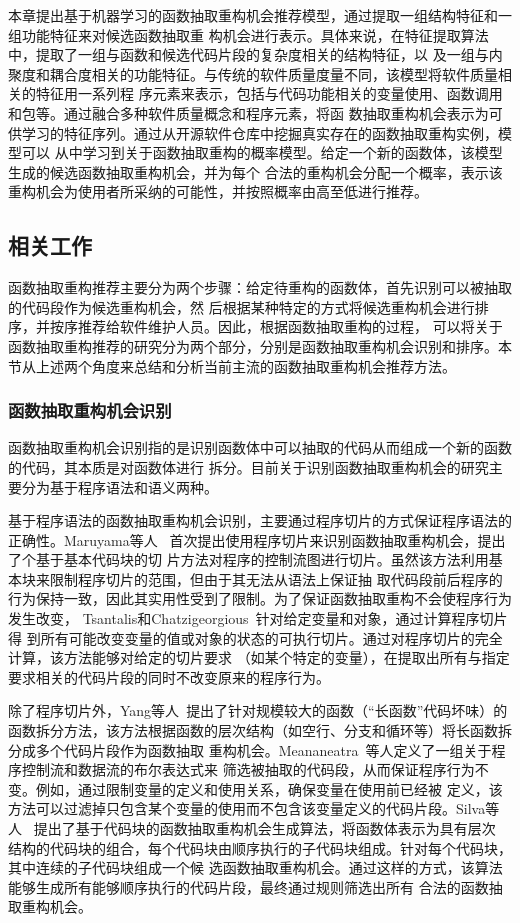 本章提出基于机器学习的函数抽取重构机会推荐模型，通过提取一组结构特征和一组功能特征来对候选函数抽取重
构机会进行表示。具体来说，在特征提取算法中，提取了一组与函数和候选代码片段的复杂度相关的结构特征，以
及一组与内聚度和耦合度相关的功能特征。与传统的软件质量度量不同，该模型将软件质量相关的特征用一系列程
序元素来表示，包括与代码功能相关的变量使用、函数调用和包等。通过融合多种软件质量概念和程序元素，将函
数抽取重构机会表示为可供学习的特征序列。通过从开源软件仓库中挖掘真实存在的函数抽取重构实例，模型可以
从中学习到关于函数抽取重构的概率模型。给定一个新的函数体，该模型生成的候选函数抽取重构机会，并为每个
合法的重构机会分配一个概率，表示该重构机会为使用者所采纳的可能性，并按照概率由高至低进行推荐。

\subsection{相关工作}
函数抽取重构推荐主要分为两个步骤：给定待重构的函数体，首先识别可以被抽取的代码段作为候选重构机会，然
后根据某种特定的方式将候选重构机会进行排序，并按序推荐给软件维护人员。因此，根据函数抽取重构的过程，
可以将关于函数抽取重构推荐的研究分为两个部分，分别是函数抽取重构机会识别和排序。本节从上述两个角度来总结和分析当前主流的函数抽取重构机会推荐方法。

\subsubsection{函数抽取重构机会识别}

函数抽取重构机会识别指的是识别函数体中可以抽取的代码从而组成一个新的函数的代码，其本质是对函数体进行
拆分。目前关于识别函数抽取重构机会的研究主要分为基于程序语法和语义两种。

基于程序语法的函数抽取重构机会识别，主要通过程序切片的方式保证程序语法的正确性。Maruyama等人
~\cite{maruyama2001automated}首次提出使用程序切片来识别函数抽取重构机会，提出了个基于基本代码块的切
片方法对程序的控制流图进行切片。虽然该方法利用基本块来限制程序切片的范围，但由于其无法从语法上保证抽
取代码段前后程序的行为保持一致，因此其实用性受到了限制。为了保证函数抽取重构不会使程序行为发生改变，
Tsantalis和Chatzigeorgious~\cite{tsantalis2011identification}针对给定变量和对象，通过计算程序切片得
到所有可能改变变量的值或对象的状态的可执行切片。通过对程序切片的完全计算，该方法能够对给定的切片要求
（如某个特定的变量），在提取出所有与指定要求相关的代码片段的同时不改变原来的程序行为。

除了程序切片外，Yang等人~\cite{yang2009identifying}提出了针对规模较大的函数（``长函数''代码坏味）的
函数拆分方法，该方法根据函数的层次结构（如空行、分支和循环等）将长函数拆分成多个代码片段作为函数抽取
重构机会。Meananeatra~\cite{meananeatra2011using}等人定义了一组关于程序控制流和数据流的布尔表达式来
筛选被抽取的代码段，从而保证程序行为不变。例如，通过限制变量的定义和使用关系，确保变量在使用前已经被
定义，该方法可以过滤掉只包含某个变量的使用而不包含该变量定义的代码片段。Silva等人
~\cite{silva:ICPC14,silva:CoRR15}提出了基于代码块的函数抽取重构机会生成算法，将函数体表示为具有层次
结构的代码块的组合，每个代码块由顺序执行的子代码块组成。针对每个代码块，其中连续的子代码块组成一个候
选函数抽取重构机会。通过这样的方式，该算法能够生成所有能够顺序执行的代码片段，最终通过规则筛选出所有
合法的函数抽取重构机会。

